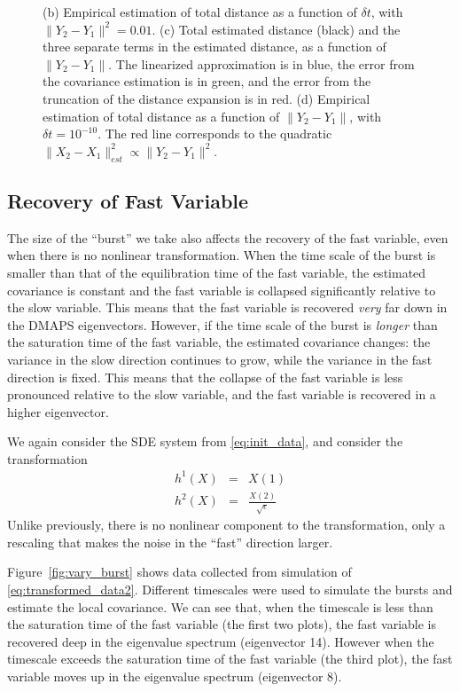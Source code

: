 \documentclass[1p]{elsarticle}
\begin{document}
\begin{figure}[h]
{%
(b) Empirical estimation of total distance as a function of $\delta t$, with $\|Y_2 - Y_1 \|^2 = 0.01$.  
%
(c) Total estimated distance (black) and the three separate terms in the estimated distance, as a function of $\|Y_2 - Y_1\|$. The linearized approximation is in blue, the error from the covariance estimation is in green, and the error from the truncation of the distance expansion is in red. 
%
(d) Empirical estimation of total distance as a function of $\|Y_2 - Y_1\|$, with $\delta t =  10^{-10}$. The red line corresponds to the quadratic $\|X_2 - X_1 \|^2_{est} \propto \|Y_2 - Y_1 \|^2$.}
\label{fig:empirical_estimation}
\end{figure}

\subsection{Recovery of Fast Variable}

The size of the ``burst'' we take also affects the recovery of the fast variable, even when there is no nonlinear transformation.
%
When the time scale of the burst is smaller than that of the equilibration time of the fast variable, the estimated covariance is constant and the fast variable is collapsed significantly relative to the slow variable.
%
This means that the fast variable is recovered {\em very} far down in the DMAPS eigenvectors.
%
However, if the time scale of the burst is {\em longer} than the saturation time of the fast variable, the estimated covariance changes: the variance in the slow direction continues to grow, while the variance in the fast direction is fixed.
%
This means that the collapse of the fast variable is less pronounced relative to the slow variable, and the fast variable is recovered in a higher eigenvector. 

We again consider the SDE system from \eqref{eq:init_data}, and consider the transformation
\begin{eqnarray}\label{eq:transformed_data2}
h^1(X) &=& X(1)  \\
h^2(X) &=& \frac{X(2)}{\sqrt{\epsilon}}
\end{eqnarray}
%
Unlike previously, there is no nonlinear component to the transformation, only a rescaling that makes the noise in the ``fast'' direction larger. 

Figure~\ref{fig:vary_burst} shows data collected from simulation of \eqref{eq:transformed_data2}.
%
Different timescales were used to simulate the bursts and estimate the local covariance. 
%
We can see that, when the timescale is less than the saturation time of the fast variable (the first two plots), the fast variable is recovered deep in the eigenvalue spectrum (eigenvector 14).
%
However when the timescale exceeds the saturation time of the fast variable (the third plot), the fast variable moves up in the eigenvalue spectrum (eigenvector 8).
\end{document}
